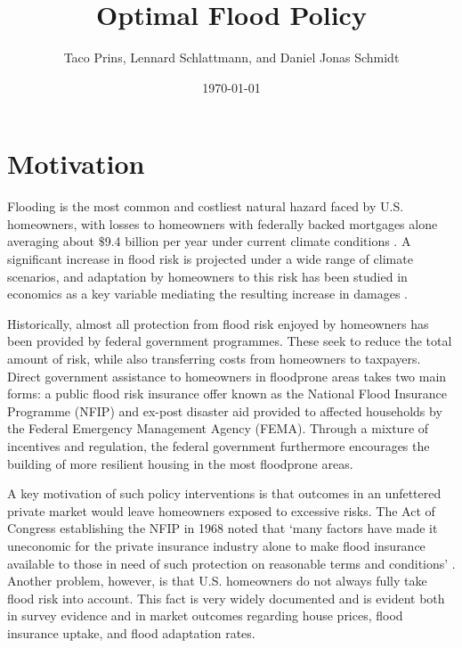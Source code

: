 \documentclass[12pt]{article}
\title{Optimal Flood Policy}
\author{Taco Prins, Lennard Schlattmann, and Daniel Jonas Schmidt}
\date{\today}
\begin{document}
\maketitle


\section{Motivation}


Flooding is the most common and costliest natural hazard faced by U.S. homeowners, with losses to homeowners with federally backed mortgages alone averaging about $\$$9.4 billion per year under current climate conditions \citep{cbo2023flooddamage}. A significant increase in flood risk is projected under a wide range of climate scenarios, and adaptation by homeowners to this risk has been studied in economics as a key variable mediating the resulting increase in damages \citep{desmet2018evaluating}. 

Historically, almost all protection from flood risk enjoyed by homeowners has been provided by federal government programmes. These seek to reduce the total amount of risk, while also transferring costs from homeowners to taxpayers. Direct government assistance to homeowners in floodprone areas takes two main forms: a public flood risk insurance offer known as the National Flood Insurance Programme (NFIP) and ex-post disaster aid provided to affected households by the Federal Emergency Management Agency (FEMA). Through a mixture of incentives and regulation, the federal government furthermore encourages the building of more resilient housing in the most floodprone areas.

A key motivation of such policy interventions is that outcomes in an unfettered private market would leave homeowners exposed to excessive risks. The Act of Congress establishing the NFIP in 1968 noted that `many factors have made it uneconomic for the private insurance industry alone to make flood insurance available to those in need of such protection on reasonable terms and conditions' \citep{nfia1968}. Another problem, however, is that U.S. homeowners do not always fully take flood risk into account. This fact is very widely documented and is evident both in survey evidence \citep[e.g.][]{bakkensen2022going,mulder2024mismeasuring} and in market outcomes regarding house prices, flood insurance uptake, and flood adaptation rates. 
\end{document}
